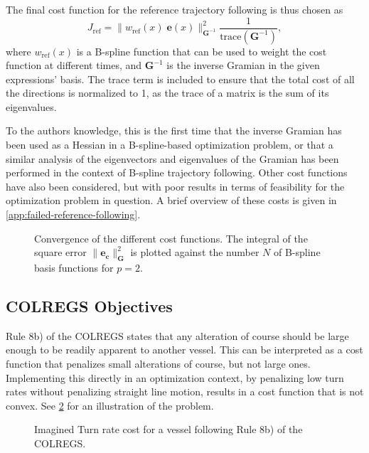 The final cost function for the reference trajectory following is thus chosen as
\begin{equation}\label{eq:cost-reference-following}
    J_\text{ref} = \|w_\text{ref}(x)\;\mathbf e(x)\|_{\mathbf G^{-1}}^2 \frac{1}{\text{trace}(\mathbf G^{-1})},
\end{equation}
where $w_\text{ref}(x)$ is a B-spline function that can be used to weight the cost function at different times, and $\mathbf G^{-1}$ is the inverse Gramian in the given expressions' basis. The trace term is included to ensure that the total cost of all the directions is normalized to 1, as the trace of a matrix is the sum of its eigenvalues.

To the authors knowledge, this is the first time that the inverse Gramian has been used as a Hessian in a B-spline-based optimization problem, or that a similar analysis of the eigenvectors and eigenvalues of the Gramian has been performed in the context of B-spline trajectory following. Other cost functions have also been considered, but with poor results in terms of feasibility for the optimization problem in question. A brief overview of these costs is given in \cref{app:failed-reference-following}.

\begin{figure}
    \centering
    
    \caption{Convergence of the different cost functions. The integral of the square error $\|\mathbf e_\mathbf c\|_\mathbf G^2$ is plotted against the number $N$ of B-spline basis functions for $p=2$.}
    \label{fig:conservativeness}
\end{figure}


\FloatBarrier
\subsection{COLREGS Objectives}\label{sec:colregs-objectives}
Rule 8b) of the COLREGS states that any alteration of course should be large enough to be readily apparent to another vessel. 
This can be interpreted as a cost function that penalizes small alterations of course, but not large ones. 
Implementing this directly in an optimization context, by penalizing low turn rates without penalizing straight line motion, results in a cost function that is not convex. 
See \cref{fig:turn-rate-cost} for an illustration of the problem.

\begin{figure}
    \centering
    
    \caption{Imagined Turn rate cost for a vessel following Rule 8b) of the COLREGS.}
    \label{fig:turn-rate-cost}
\end{figure}

